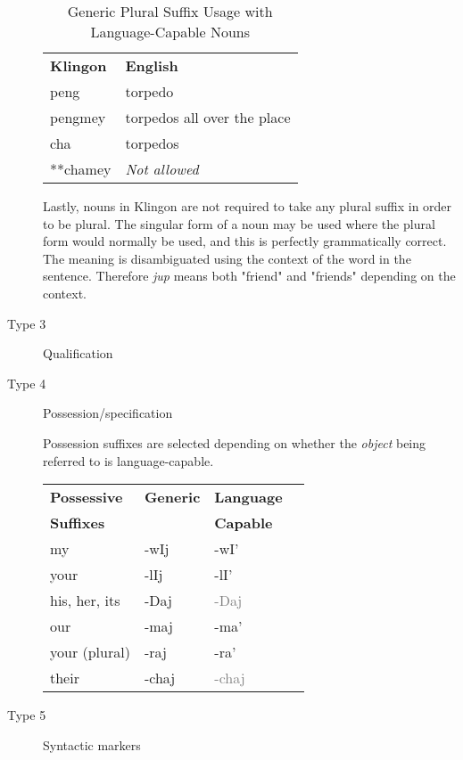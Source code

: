 \documentclass[11pt]{article}
\begin{document}
\begin{description}
	\begin{table}[h]
\begin{center}
\begin{tabular}{l|l}
\bf Klingon & \bf English \\
peng & torpedo \\
pengmey & torpedos all over the place \\
cha & torpedos \\
**chamey & \it Not allowed \\
\end{tabular}
\end{center}
\caption{Generic Plural Suffix Usage with Language-Capable Nouns}
\end{table}

	Lastly, nouns in Klingon are not required to take any plural suffix in order to be plural. The singular form of a noun may be used where the plural form would normally be used, and this is perfectly grammatically correct. The meaning is disambiguated using the context of the word in the sentence. Therefore \textit{jup} means both "friend" and "friends" depending on the context.

	\item[Type 3] Qualification
	\item[Type 4] Possession/specification
	
	Possession suffixes are selected depending on whether the \textit{object} being referred to is language-capable.

	\begin{center}
	\begin{tabular}{ | l | l | l | l |}
	\hline
	\bf{Possessive} & \bf{Generic} & \bf{Language} \\
	\bf{Suffixes} & & \bf{Capable} \\ \hline
	my & -wIj & -wI' \\ \hline
	your & -lIj & -lI' \\ \hline
	his, her, its & -Daj & \textcolor{gray}{-Daj} \\ \hline
	our & -maj & -ma' \\ \hline
	your (plural) & -raj & -ra' \\ \hline
	their & -chaj & \textcolor{gray}{-chaj} \\
	\hline
	\end{tabular}
	\end{center}

	\item[Type 5] Syntactic markers
\end{description}
\end{document}
